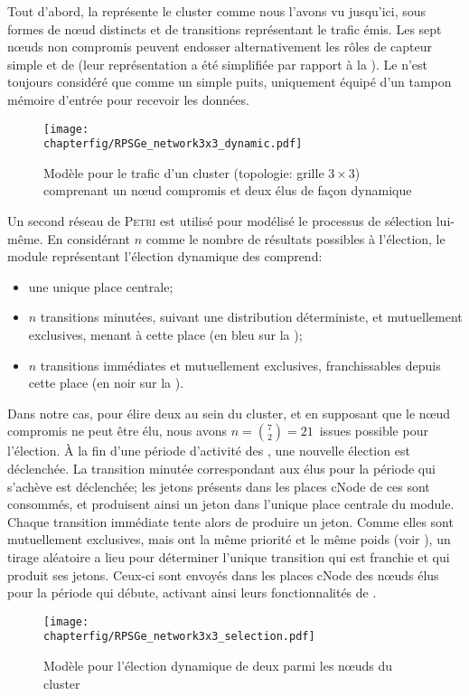 Tout d'abord, la  représente le cluster comme nous l'avons vu jusqu'ici, sous formes de nœud distincts et de transitions représentant le trafic émis.
Les sept nœuds non compromis peuvent endosser alternativement les rôles de capteur simple et de \cn (leur représentation a été simplifiée par rapport à la ).
Le \ch n'est toujours considéré que comme un simple puits, uniquement équipé d'un tampon mémoire d'entrée pour recevoir les données.
\begin{figure}[ht]
    \centering
    \texttt{[image: \\chapterfig/RPSGe\_network3x3\_dynamic.pdf]}
    \caption{Modèle \rpsge pour le trafic d'un cluster (topologie: grille $3\times3$) comprenant un nœud compromis et deux \cns élus de façon dynamique}\label{sa:fig:petridyn}
\end{figure}

Un second réseau de \textsc{Petri} est utilisé pour modélisé le processus de sélection lui-même.
En considérant $n$ comme le nombre de résultats possibles à l'élection, le module représentant l'élection dynamique des \cns comprend:
\begin{itemize}
    \item une unique place centrale;
    \item $n$ transitions minutées, suivant une distribution déterministe, et mutuellement exclusives, menant à cette place (en bleu sur la );
    \item $n$ transitions immédiates et mutuellement exclusives, franchissables depuis cette place (en noir sur la ).
\end{itemize}
Dans notre cas, pour élire deux \cns au sein du cluster, et en supposant que le nœud compromis ne peut être élu, nous avons $n=\binom{7}{2}=21$~issues possible pour l'élection.
À la fin d'une période d'activité des \cns, une nouvelle élection est déclenchée.
La transition minutée correspondant aux \cns élus pour la période qui s'achève est déclenchée; les jetons présents dans les places \textsf{cNode} de ces \cns sont consommés, et produisent ainsi un jeton dans l'unique place centrale du module.
Chaque transition immédiate tente alors de produire un jeton.
Comme elles sont mutuellement exclusives, mais ont la même priorité et le même poids (voir ), un tirage aléatoire a lieu pour déterminer l'unique transition qui est franchie et qui produit ses jetons.
Ceux-ci sont envoyés dans les places \textsf{cNode} des nœuds élus pour la période qui débute, activant ainsi leurs fonctionnalités de \cns.
\begin{figure}[!ht]
    \centering
    \texttt{[image: \\chapterfig/RPSGe\_network3x3\_selection.pdf]}
    \caption{Modèle \rpsge pour l'élection dynamique de deux \cns parmi les nœuds du cluster}\label{sa:fig:petrielec}
\end{figure}
